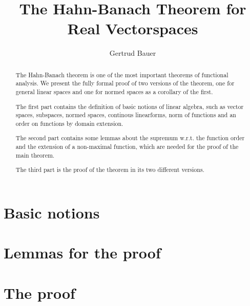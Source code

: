 \documentclass[11pt,a4paper,twoside]{article}
\begin{document}
\pagestyle{headings}

\title{The Hahn-Banach Theorem for Real Vectorspaces}
\author{Gertrud Bauer}
\maketitle

\begin{abstract}
The Hahn-Banach theorem is one of the most important theorems
of functional analysis. We present the fully formal proof of two versions of
the theorem, one for general linear spaces and one for normed spaces
as a corollary of the first. 

The first part contains the definition of basic notions of
linear algebra, such as vector spaces, subspaces, normed spaces,
continous linearforms, norm of functions and an order on
functions by domain extension.

The second part contains some lemmas about the supremum w.r.t. the
function order and the extension of a non-maximal function, 
which are needed for the proof of the main theorem.

The third part is the proof of the theorem in its two different versions.

\end{abstract}

\tableofcontents

\part {Basic notions}











\part {Lemmas for the proof}




\part {The proof}




\end{document}
